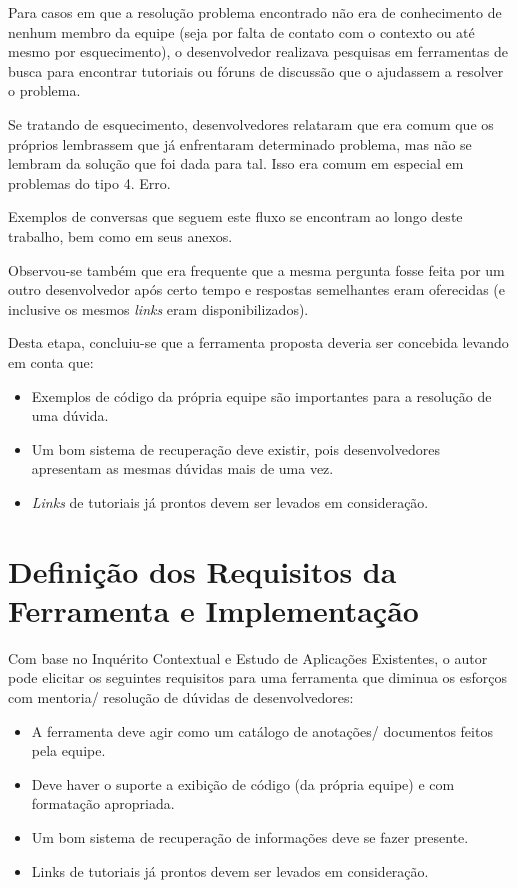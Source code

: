 Para casos em que a resolução problema encontrado não era de conhecimento de nenhum membro da equipe (seja por falta de contato com o contexto ou até mesmo por esquecimento), o desenvolvedor realizava pesquisas em ferramentas de busca para encontrar tutoriais ou fóruns de discussão que o ajudassem a resolver o problema.

Se tratando de esquecimento, desenvolvedores relataram que era comum que os próprios lembrassem que já enfrentaram determinado problema, mas não se lembram da solução que foi dada para tal. Isso era comum em especial em problemas do tipo 4. Erro.

Exemplos de conversas que seguem este fluxo se encontram ao longo deste trabalho, bem como em seus anexos.

Observou-se também que era frequente que a mesma pergunta fosse feita por um outro desenvolvedor após certo tempo e respostas semelhantes eram oferecidas (e inclusive os mesmos \textit{links} eram disponibilizados).

Desta etapa, concluiu-se que a ferramenta proposta deveria ser concebida levando em conta que:

\begin{itemize}
  \item Exemplos de código da própria equipe são importantes para a resolução de uma dúvida.
  \item Um bom sistema de recuperação deve existir, pois desenvolvedores apresentam as mesmas dúvidas mais de uma vez.
  \item \textit{Links} de tutoriais já prontos devem ser levados em consideração.
\end{itemize}

\section{Definição dos Requisitos da Ferramenta e Implementação}

Com base no Inquérito Contextual e Estudo de Aplicações Existentes, o autor pode elicitar os seguintes requisitos para uma ferramenta que diminua os esforços com mentoria/ resolução de dúvidas de desenvolvedores:

\begin{itemize}
  \item A ferramenta deve agir como um catálogo de anotações/ documentos feitos pela equipe.
  \item Deve haver o suporte a exibição de código (da própria equipe) e com formatação apropriada.
  \item Um bom sistema de recuperação de informações deve se fazer presente.
  \item Links de tutoriais já prontos devem ser levados em consideração.
\end{itemize}

